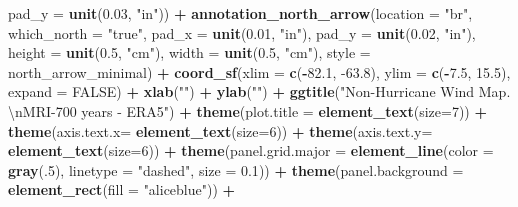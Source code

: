 \documentclass[12pt,twoside]{reedthesis}
\newenvironment{Shaded}{\begin{snugshade}}{\end{snugshade}}
\newcommand{\CharTok}[1]{\textcolor[rgb]{0.31,0.60,0.02}{#1}}
\newcommand{\DataTypeTok}[1]{\textcolor[rgb]{0.13,0.29,0.53}{#1}}
\newcommand{\DecValTok}[1]{\textcolor[rgb]{0.00,0.00,0.81}{#1}}
\newcommand{\FloatTok}[1]{\textcolor[rgb]{0.00,0.00,0.81}{#1}}
\newcommand{\KeywordTok}[1]{\textcolor[rgb]{0.13,0.29,0.53}{\textbf{#1}}}
\newcommand{\NormalTok}[1]{#1}
\newcommand{\OperatorTok}[1]{\textcolor[rgb]{0.81,0.36,0.00}{\textbf{#1}}}
\newcommand{\OtherTok}[1]{\textcolor[rgb]{0.56,0.35,0.01}{#1}}
\newcommand{\StringTok}[1]{\textcolor[rgb]{0.31,0.60,0.02}{#1}}
\begin{document}
\begin{Shaded}
\begin{Highlighting}[]
   \DataTypeTok{pad_y =} \KeywordTok{unit}\NormalTok{(}\FloatTok{0.03}\NormalTok{, }\StringTok{"in"}\NormalTok{)) }\OperatorTok{+}\StringTok{ }
\StringTok{  }\KeywordTok{annotation_north_arrow}\NormalTok{(}\DataTypeTok{location =} \StringTok{"br"}\NormalTok{, }\DataTypeTok{which_north =} \StringTok{"true"}\NormalTok{, }\DataTypeTok{pad_x =} \KeywordTok{unit}\NormalTok{(}\FloatTok{0.01}\NormalTok{, }\StringTok{"in"}\NormalTok{), }\DataTypeTok{pad_y =} \KeywordTok{unit}\NormalTok{(}\FloatTok{0.02}\NormalTok{, }\StringTok{"in"}\NormalTok{), }\DataTypeTok{height =} \KeywordTok{unit}\NormalTok{(}\FloatTok{0.5}\NormalTok{, }\StringTok{"cm"}\NormalTok{), }
   \DataTypeTok{width =} \KeywordTok{unit}\NormalTok{(}\FloatTok{0.5}\NormalTok{, }\StringTok{"cm"}\NormalTok{), }\DataTypeTok{style =}\NormalTok{ north_arrow_minimal) }\OperatorTok{+}
\StringTok{  }\KeywordTok{coord_sf}\NormalTok{(}\DataTypeTok{xlim =} \KeywordTok{c}\NormalTok{(}\OperatorTok{-}\FloatTok{82.1}\NormalTok{, }\FloatTok{-63.8}\NormalTok{), }\DataTypeTok{ylim =} \KeywordTok{c}\NormalTok{(}\OperatorTok{-}\FloatTok{7.5}\NormalTok{, }\FloatTok{15.5}\NormalTok{), }\DataTypeTok{expand =} \OtherTok{FALSE}\NormalTok{) }\OperatorTok{+}
\StringTok{  }\KeywordTok{xlab}\NormalTok{(}\StringTok{""}\NormalTok{) }\OperatorTok{+}\StringTok{ }
\StringTok{  }\KeywordTok{ylab}\NormalTok{(}\StringTok{""}\NormalTok{) }\OperatorTok{+}\StringTok{ }
\StringTok{  }\KeywordTok{ggtitle}\NormalTok{(}\StringTok{"Non-Hurricane Wind Map. }\CharTok{\textbackslash{}n}\StringTok{MRI-700 years - ERA5"}\NormalTok{) }\OperatorTok{+}\StringTok{ }
\StringTok{  }\KeywordTok{theme}\NormalTok{(}\DataTypeTok{plot.title =} \KeywordTok{element_text}\NormalTok{(}\DataTypeTok{size=}\DecValTok{7}\NormalTok{)) }\OperatorTok{+}
\StringTok{  }\KeywordTok{theme}\NormalTok{(}\DataTypeTok{axis.text.x=} \KeywordTok{element_text}\NormalTok{(}\DataTypeTok{size=}\DecValTok{6}\NormalTok{)) }\OperatorTok{+}\StringTok{ }
\StringTok{  }\KeywordTok{theme}\NormalTok{(}\DataTypeTok{axis.text.y=} \KeywordTok{element_text}\NormalTok{(}\DataTypeTok{size=}\DecValTok{6}\NormalTok{)) }\OperatorTok{+}
\StringTok{  }\KeywordTok{theme}\NormalTok{(}\DataTypeTok{panel.grid.major =} \KeywordTok{element_line}\NormalTok{(}\DataTypeTok{color =} \KeywordTok{gray}\NormalTok{(.}\DecValTok{5}\NormalTok{), }\DataTypeTok{linetype =} \StringTok{"dashed"}\NormalTok{, }\DataTypeTok{size =} \FloatTok{0.1}\NormalTok{)) }\OperatorTok{+}
\StringTok{  }\KeywordTok{theme}\NormalTok{(}\DataTypeTok{panel.background =} \KeywordTok{element_rect}\NormalTok{(}\DataTypeTok{fill =} \StringTok{"aliceblue"}\NormalTok{)) }\OperatorTok{+}

\end{Highlighting}
\end{Shaded}
\end{document}
